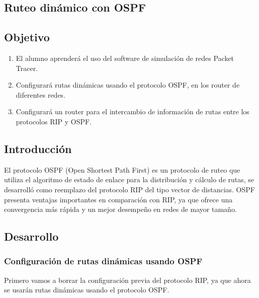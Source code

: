 \documentclass[14pt]{book}
\begin{document}
{\color{red} \subsection*{\textbf{Ruteo dinámico con OSPF}}}
\vspace{1em}

{\color{red} \subsection*{\textbf{Objetivo}}}
\vspace{1em}

\begin{enumerate}
  \item El alumno aprenderá el uso del software de simulación de redes Packet Tracer.
  \item Configurará rutas dinámicas usando el protocolo OSPF, en los router de diferentes redes.
  \item Configurará un router para el intercambio de información de rutas entre los protocolos RIP y OSPF.
\end{enumerate}

{\color{red} \subsection*{\textbf{Introducción}}}
\vspace{1em}

El protocolo OSPF (Open Shortest Path First) es un protocolo de ruteo que utiliza el algoritmo de
estado de enlace para la distribución y cálculo de rutas, se desarrolló como reemplazo del protocolo
RIP del tipo vector de distancias. OSPF presenta ventajas importantes en comparación con RIP,
ya que ofrece una convergencia más rápida y un mejor desempeño en redes de mayor tamaño.\\

{\color{red} \subsection*{\textbf{Desarrollo}}}
\vspace{1em}

{\color{blue} \subsubsection*{\textbf{Configuración de rutas dinámicas usando OSPF}}}
\vspace{1em}

Primero vamos a borrar la configuración previa del protocolo RIP, ya que ahora se usarán rutas dinámicas usando el
protocolo OSPF.\\
\end{document}
